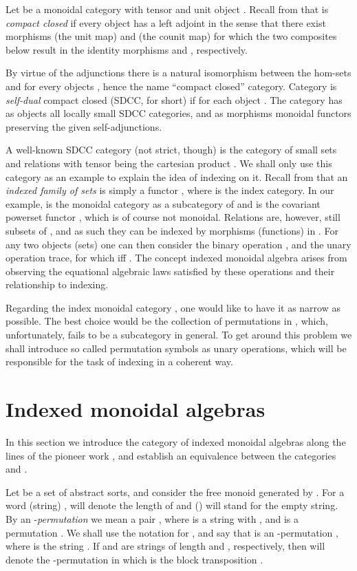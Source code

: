 \documentclass{eptcs}
\begin{document}
Let  be a monoidal category with tensor  and unit object .
Recall from \cite{cc,tra} that  is {\em compact closed\/} if every
object  has a left adjoint  in the sense that there exist morphisms
 (the unit map) and  (the
counit map) for which the two composites below result in the identity
morphisms  and , respectively.
 

By virtue of the adjunctions  there is a natural isomorphism between the 
hom-sets  and  for every objects ,
hence the name ``compact closed'' category. Category  is {\em
self-dual\/} compact closed (SDCC, for short) if  for each object .
The category  has as objects all locally small \cite{mcl}
SDCC categories, and as
morphisms monoidal functors preserving the given self-adjunctions.

A well-known SDCC category (not strict, though) is the category  of 
small sets and
relations with tensor being the cartesian product .
We shall only use this category as an example to explain the idea of indexing on it.
Recall from \cite {bur,hel} that an {\em indexed family of sets\/} is simply a functor
, where  is the index category.  In our example,
 is the monoidal category  as a subcategory of 
and  is the covariant powerset functor , which is of course not
monoidal. Relations  are, however, still subsets of , and as 
such they can be indexed by morphisms (functions)  in .
For any two objects (sets) one can then consider the binary operation , and the unary operation
trace,  for which 
iff . The concept indexed monoidal algebra arises from
observing the equational algebraic laws satisfied by these operations and their 
relationship to indexing. 

  Regarding the index monoidal category , one would like to have it as narrow as possible.
The best choice would be the collection of permutations in , which, unfortunately,
fails to be a subcategory in general. To get around this 
problem we shall introduce so called permutation symbols as unary operations,
which will be responsible for the task of indexing in a coherent way.
\section{Indexed monoidal algebras}
In this section we introduce the category  of indexed monoidal algebras
along the lines of the pioneer work \cite{hel}, and establish 
an equivalence between the categories  and .

Let  be a set of abstract sorts, and consider the free monoid 
generated by .  For a word (string) ,  will denote the
length of  and () will stand for the empty string. By an 
-{\em permutation\/} we mean a pair , where  is
a string with , and  is a permutation . We shall
use the notation  for , and say that  is an
-permutation , where  is the string .  If  and  are strings of length  and ,
respectively, then   will denote the -permutation  in which  is the block transposition .
\end{document}
